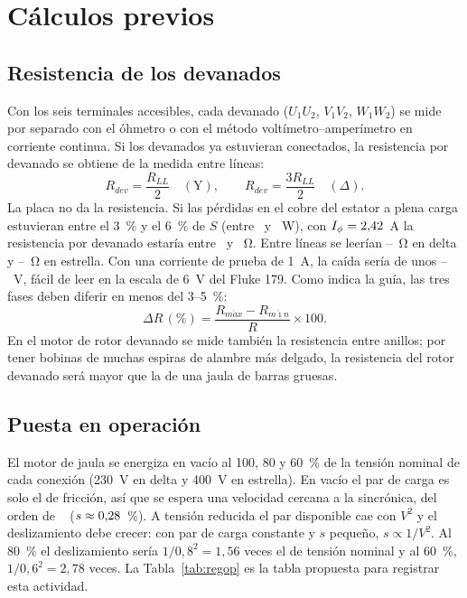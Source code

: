 \documentclass[conference]{IEEEtran}
\begin{document}
\section{Cálculos previos}

\subsection{Resistencia de los devanados}
Con los seis terminales accesibles, cada devanado ($U_1U_2$, $V_1V_2$, $W_1W_2$) se mide por separado con el óhmetro o con el método voltímetro--amperímetro en corriente continua. Si los devanados ya estuvieran conectados, la resistencia por devanado se obtiene de la medida entre líneas:
\begin{equation}
R_{dev}=\frac{R_{LL}}{2}\quad(\mathrm{Y}),\qquad R_{dev}=\frac{3R_{LL}}{2}\quad(\Delta).
\label{eq:rll}
\end{equation}
La placa no da la resistencia. Si las pérdidas en el cobre del estator a plena carga estuvieran entre el \SI{3}{\percent} y el \SI{6}{\percent} de $S$ (entre \DLPcuLo\ y \DLPcuHi~\si{W}), con $I_\phi=\num{2.42}$~\si{A} la resistencia por devanado estaría entre \DLRLo\ y \DLRHi~\si{\ohm}. Entre líneas se leerían \DLRDLo--\DLRDHi~\si{\ohm} en delta y \DLRYLo--\DLRYHi~\si{\ohm} en estrella. Con una corriente de prueba de \SI{1}{A}, la caída sería de unos \DLVpruebaLo--\DLVpruebaHi~\si{V}, fácil de leer en la escala de \SI{6}{V} del Fluke 179. Como indica la guía, las tres fases deben diferir en menos del 3--5~\%:
\begin{equation}
\Delta R\,(\%)=\frac{R_{m\acute{a}x}-R_{m\acute{\imath}n}}{R}\times100 .
\label{eq:dr}
\end{equation}
En el motor de rotor devanado se mide también la resistencia entre anillos; por tener bobinas de muchas espiras de alambre más delgado, la resistencia del rotor devanado será mayor que la de una jaula de barras gruesas.

\subsection{Puesta en operación}
El motor de jaula se energiza en vacío al 100, 80 y \SI{60}{\percent} de la tensión nominal de cada conexión (\SI{230}{V} en delta y \SI{400}{V} en estrella). En vacío el par de carga es solo el de fricción, así que se espera una velocidad cercana a la sincrónica, del orden de \DLnVac~\si{\rpm} ($s\approx\num{0.28}$~\%). A tensión reducida el par disponible cae con $V^2$ y el deslizamiento debe crecer: con par de carga constante y $s$ pequeño, $s\propto1/V^2$. Al \SI{80}{\percent} el deslizamiento sería $1/0{,}8^2=1{,}56$ veces el de tensión nominal y al \SI{60}{\percent}, $1/0{,}6^2=2{,}78$ veces. La Tabla~\ref{tab:regop} es la tabla propuesta para registrar esta actividad.
\end{document}
